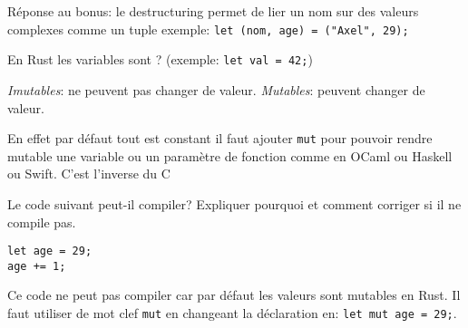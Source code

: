 \documentclass[11pt,a4paper,addpoint]{exam}
\begin{document}
\begin{questions}
\begin{solution}
    Réponse au bonus: le destructuring permet de lier un nom sur des valeurs complexes comme un tuple exemple: \texttt{let (nom, age) = ("Axel", 29);}
    \end{solution}
    \else
    \vspace{1.5in}
    \fi

    \question[1] En Rust les variables sont ? (exemple: \texttt{let val = 42;})
    \begin{checkboxes}
        \CorrectChoice \emph{Imutables}: ne peuvent pas changer de valeur.
        \choice \emph{Mutables}: peuvent changer de valeur.
    \end{checkboxes}
    \ifprintanswers
    \begin{solution}
        En effet par défaut tout est constant il faut ajouter \texttt{mut} pour pouvoir rendre mutable une variable ou un paramètre de fonction comme en OCaml ou Haskell ou Swift.
        C'est l'inverse du C
    \end{solution}
    \else
    \fi

    \question[1] Le code suivant peut-il compiler? Expliquer pourquoi et comment corriger si il ne compile pas.
\begin{verbatim}
let age = 29;
age += 1;
\end{verbatim}

\ifprintanswers
\begin{solution}
Ce code ne peut pas compiler car par défaut les valeurs sont mutables en Rust.
Il faut utiliser de mot clef \texttt{mut} en changeant la déclaration en: \texttt{let mut age = 29;}.
\end{solution}
\else
\vspace{1.5in}
\fi


\end{questions}
\end{document}
